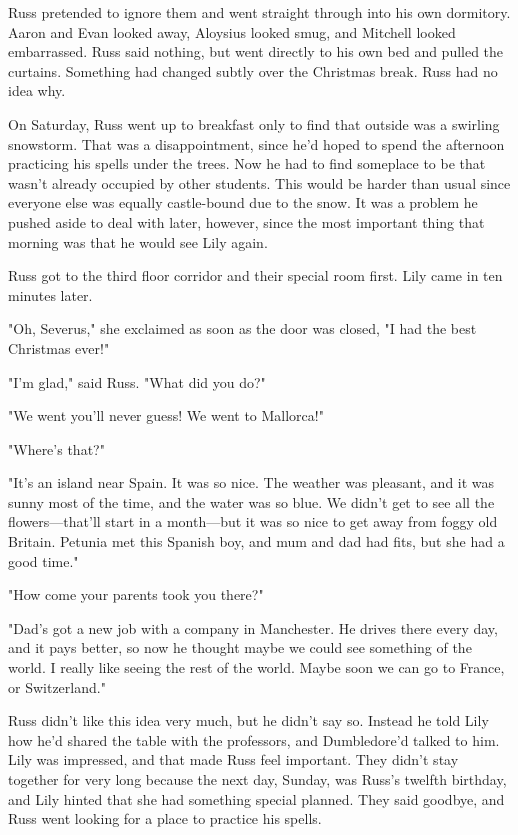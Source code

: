 Russ pretended to ignore them and went straight through into his own dormitory. Aaron and Evan looked away, Aloysius looked smug, and Mitchell looked embarrassed. Russ said nothing, but went directly to his own bed and pulled the curtains. Something had changed subtly over the Christmas break. Russ had no idea why.

On Saturday, Russ went up to breakfast only to find that outside was a swirling snowstorm. That was a disappointment, since he'd hoped to spend the afternoon practicing his spells under the trees. Now he had to find someplace to be that wasn't already occupied by other students. This would be harder than usual since everyone else was equally castle-bound due to the snow. It was a problem he pushed aside to deal with later, however, since the most important thing that morning was that he would see Lily again.

Russ got to the third floor corridor and their special room first. Lily came in ten minutes later.

"Oh, Severus," she exclaimed as soon as the door was closed, "I had the best Christmas ever!"

"I'm glad," said Russ. "What did you do?"

"We went{\el} you'll never guess! We went to Mallorca!"

"Where's that?"

"It's an island near Spain. It was so nice. The weather was pleasant, and it was sunny most of the time, and the water was so blue. We didn't get to see all the flowers—that'll start in a month—but it was so nice to get away from foggy old Britain. Petunia met this Spanish boy, and mum and dad had fits, but she had a good time."

"How come your parents took you there?"

"Dad's got a new job with a company in Manchester. He drives there every day, and it pays better, so now he thought maybe we could see something of the world. I really like seeing the rest of the world. Maybe soon we can go to France, or Switzerland."

Russ didn't like this idea very much, but he didn't say so. Instead he told Lily how he'd shared the table with the professors, and Dumbledore'd talked to him. Lily was impressed, and that made Russ feel important. They didn't stay together for very long because the next day, Sunday, was Russ's twelfth birthday, and Lily hinted that she had something special planned. They said goodbye, and Russ went looking for a place to practice his spells.

